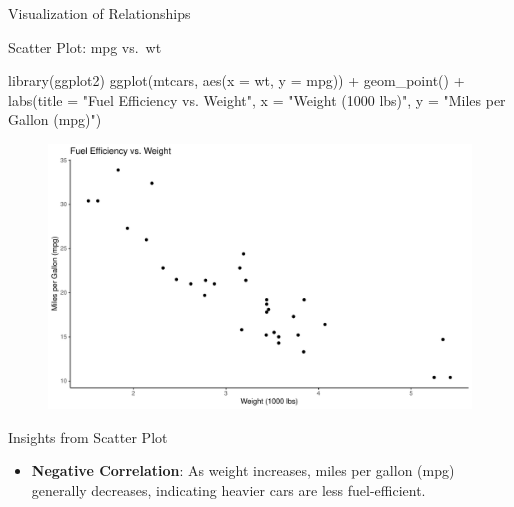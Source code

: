 \documentclass[
  18 pt,
  ignorenonframetext,
  aspectratio=1610,
]{beamer}
\newenvironment{Shaded}{\begin{snugshade}}{\end{snugshade}}
\newcommand{\AttributeTok}[1]{\textcolor[rgb]{0.40,0.45,0.13}{#1}}
\newcommand{\FunctionTok}[1]{\textcolor[rgb]{0.28,0.35,0.67}{#1}}
\newcommand{\NormalTok}[1]{\textcolor[rgb]{0.00,0.23,0.31}{#1}}
\newcommand{\SpecialCharTok}[1]{\textcolor[rgb]{0.37,0.37,0.37}{#1}}
\newcommand{\StringTok}[1]{\textcolor[rgb]{0.13,0.47,0.30}{#1}}
\providecommand{\tightlist}{%
  \setlength{\itemsep}{0pt}\setlength{\parskip}{0pt}}\usepackage{longtable,booktabs,array}
\begin{document}
\begin{frame}[fragile]{Visualization of Relationships}
\protect\hypertarget{visualization-of-relationships}{}
\begin{block}{Scatter Plot: mpg vs.~wt}
\protect\hypertarget{scatter-plot-mpg-vs.-wt}{}
\tiny

\begin{Shaded}
\begin{Highlighting}[]
\FunctionTok{library}\NormalTok{(ggplot2)}
\FunctionTok{ggplot}\NormalTok{(mtcars, }\FunctionTok{aes}\NormalTok{(}\AttributeTok{x =}\NormalTok{ wt, }\AttributeTok{y =}\NormalTok{ mpg)) }\SpecialCharTok{+}
  \FunctionTok{geom\_point}\NormalTok{() }\SpecialCharTok{+}
  \FunctionTok{labs}\NormalTok{(}\AttributeTok{title =} \StringTok{"Fuel Efficiency vs. Weight"}\NormalTok{,}
       \AttributeTok{x =} \StringTok{"Weight (1000 lbs)"}\NormalTok{,}
       \AttributeTok{y =} \StringTok{"Miles per Gallon (mpg)"}\NormalTok{)}
\end{Highlighting}
\end{Shaded}

\begin{figure}

{\centering \includegraphics[width=\textwidth,height=0.5\textheight]{R-Regression_files/figure-beamer/unnamed-chunk-6-1.pdf}

}

\end{figure}

\begin{block}{Insights from Scatter Plot}
\protect\hypertarget{insights-from-scatter-plot}{}
\begin{itemize}
\tightlist
\item
  \textbf{Negative Correlation}: As weight increases, miles per gallon
  (mpg) generally decreases, indicating heavier cars are less
  fuel-efficient.
\end{itemize}

\normalsize
\end{block}
\end{block}
\end{frame}
\end{document}
